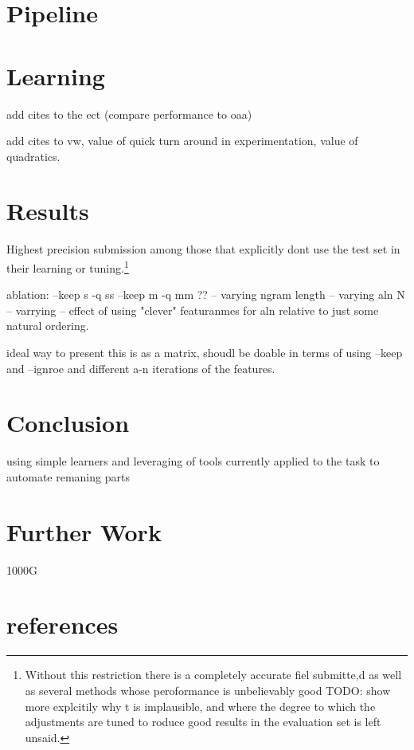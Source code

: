 \documentclass{article}
\begin{document}



\section{Pipeline}

\section{Learning}

add cites to the ect (compare performance to oaa) 

add cites to vw, value of quick turn around in experimentation, value of quadratics.

\section{Results}

Highest precision submission among those that explicitly dont use the test set in their learning or tuning.\footnote{ Without this restriction there is a completely accurate fiel submitte,d as well as several methods whose peroformance is unbelievably good TODO: show more explcitily why t is implausible, and where the degree to which the adjustments are tuned to roduce good results in the evaluation set is left unsaid.}

ablation:
--keep s -q ss
--keep m -q mm
??
-- varying ngram length
-- varying aln N
-- varrying 
-- effect of using "clever" featuranmes for aln relative to just some natural ordering.

ideal way to present this is as a matrix, shoudl be doable in terms of using --keep and --ignroe and different a-n iterations of the features.

\section{Conclusion}

using simple learners and leveraging of tools currently applied to the task to automate remaning parts


\section{Further Work}
1000G

\section{references}
\end{document}
